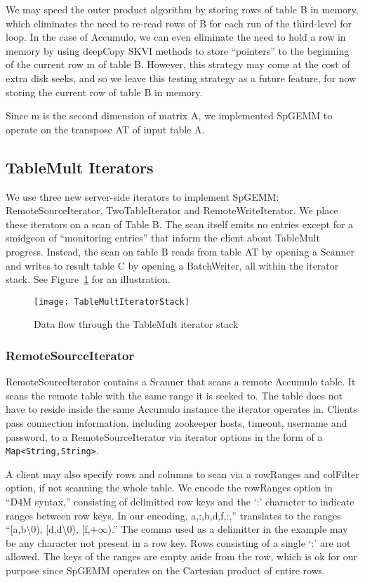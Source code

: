 We may speed the outer product algorithm by storing rows of table B in memory,
which eliminates the need to re-read rows of B for each run of the third-level for loop.
In the case of Accumulo, we can even eliminate the need to hold a row in memory by using
deepCopy SKVI methods to store ``pointers'' to the beginning of the current row m of table B.
However, this strategy may come at the cost of extra disk seeks, and so
we leave this testing strategy as a future feature, for now storing the current row of table B in memory.

Since m is the second dimension of matrix A, we implemented SpGEMM to operate on the transpose AT of input table A.



\subsection{TableMult Iterators}
We use three new server-side iterators to implement SpGEMM: 
RemoteSourceIterator, TwoTableIterator and RemoteWriteIterator.
We place these iterators on a scan of Table B. The scan itself emits no 
entries except for a smidgeon of ``monitoring entries'' that inform the client 
about TableMult progress. Instead, the scan on table B reads from table AT
by opening a Scanner and writes to result table C
by opening a BatchWriter, all within the iterator stack.
See Figure~\ref{fIteratorStackSpGEMM} for an illustration.

\begin{figure}[htb]
\centering
\texttt{[image: TableMultIteratorStack]}
\caption{Data flow through the TableMult iterator stack}
\label{fIteratorStackSpGEMM}
\end{figure}

\subsubsection{RemoteSourceIterator}
RemoteSourceIterator contains a Scanner that scans a remote Accumulo table.  
It scans the remote table with the same range it is seeked to.
The table does not have to reside inside the same Accumulo instance the iterator
operates in. Clients pass connection information, including zookeeper hosts, timeout,
username and password, to a RemoteSourceIterator via iterator options
in the form of a \texttt{Map<String,String>}.

A client may also specify rows and columns to scan via a rowRanges and colFilter option, 
if not scanning the whole table. We encode the rowRanges option in ``D4M syntax,'' consisting of 
delimitted row keys and the `:' character to indicate ranges between row keys.
In our encoding, a,:,b,d,f,:,'' translates to the ranges 
``[a,b\textbackslash{}0), [d,d\textbackslash{}0), [f,$+\infty$).'' The comma used as a delimitter in the example 
may be any character not present in a row key.  Rows consisting of a single `:' are not allowed.
The keys of the ranges are empty aside from the row, which is ok for our purpose since SpGEMM
operates on the Cartesian product of entire rows.


